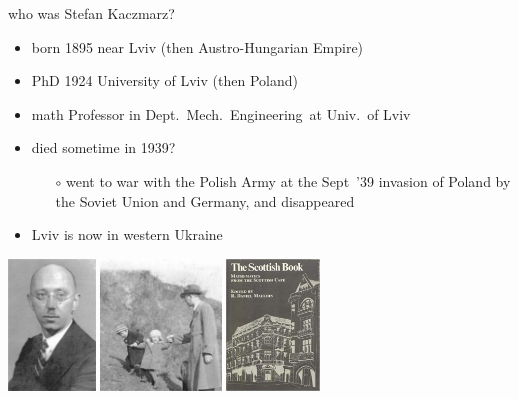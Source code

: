 \documentclass[usepdftitle=false,usenames,dvipsnames]{beamer}
\begin{document}
\begin{frame}{who was Stefan Kaczmarz?}

\begin{itemize}
\item born 1895 near Lviv (then Austro-Hungarian Empire)
\item PhD 1924 University of Lviv (then Poland)
\item math Professor in Dept.~Mech.~Engineering~at Univ.~of Lviv
\item died sometime in 1939?
    \begin{itemize}
    \item[$\circ$] went to war with the Polish Army at the Sept~'39 invasion of Poland by the Soviet Union and Germany, and disappeared
    \end{itemize}
\item Lviv is now in western Ukraine
\end{itemize}

\begin{center}
\includegraphics[height=35mm]{figs/StefanKaczmarz} \qquad \includegraphics[height=35mm]{figs/Kaczmarz-w-2-daughters} \qquad \includegraphics[height=35mm]{figs/scottish-book}
\end{center}
\end{frame}
\end{document}
